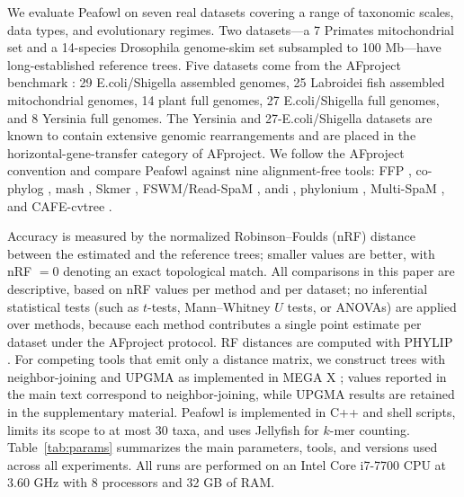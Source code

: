 \documentclass[11pt]{article}
\begin{document}
We evaluate Peafowl on seven real datasets covering a range of taxonomic
scales, data types, and evolutionary regimes. Two datasets---a 7 Primates
mitochondrial set and a 14-species Drosophila genome-skim set subsampled to
100 Mb---have long-established reference trees. Five datasets come from the
AFproject benchmark \citep{zielezinski2019afproject}: 29 E.coli/Shigella
assembled genomes, 25 Labroidei fish assembled mitochondrial genomes, 14
plant full genomes, 27 E.coli/Shigella full genomes, and 8 Yersinia full
genomes. The Yersinia and 27-E.coli/Shigella datasets are known to contain
extensive genomic rearrangements and are placed in the horizontal-gene-transfer
category of AFproject. We follow the AFproject convention and compare Peafowl
against nine alignment-free tools: FFP \citep{sims2009ffp}, co-phylog
\citep{yi2013cophylog}, mash \citep{ondov2016mash}, Skmer
\citep{sarmashghi2019skmer}, FSWM/Read-SpaM \citep{lau2019readspam}, andi
\citep{haubold2015andi}, phylonium \citep{klotzl2020phylonium}, Multi-SpaM
\citep{dencker2020multispam}, and CAFE-cvtree \citep{lu2017cafe, gao2007cvtree}.

Accuracy is measured by the normalized Robinson--Foulds (nRF) distance
\citep{robinson1981rf} between the estimated and the reference trees;
smaller values are better, with nRF $= 0$ denoting an exact topological
match. All comparisons in this paper are descriptive, based on nRF values
per method and per dataset; no inferential statistical tests (such as
$t$-tests, Mann--Whitney $U$ tests, or ANOVAs) are applied over methods,
because each method contributes a single point estimate per dataset under
the AFproject protocol. RF distances are computed with PHYLIP
\citep{felsenstein1989phylip}. For competing tools that emit only a
distance matrix, we construct trees with neighbor-joining
\citep{saitou1987nj} and UPGMA \citep{sokal1958upgma} as implemented in
MEGA X \citep{kumar2018megax}; values reported in the main text correspond
to neighbor-joining, while UPGMA results are retained in the supplementary
material. Peafowl is implemented in C++ and shell
scripts, limits its scope to at most 30 taxa, and uses Jellyfish for
$k$-mer counting. Table~\ref{tab:params} summarizes the main parameters,
tools, and versions used across all experiments. All runs are performed
on an Intel Core i7-7700 CPU at 3.60 GHz with 8 processors and 32 GB of
RAM.
\end{document}
